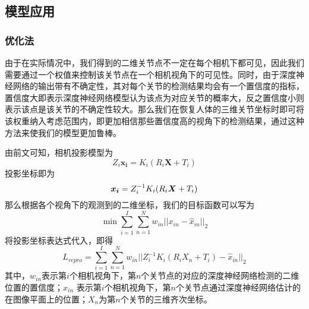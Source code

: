 \subsection{模型应用}

\subsubsection{优化法}
由于在实际情况中，我们得到的二维关节点不一定在每个相机下都可见，因此我们需要通过一个权值来控制该关节点在一个相机视角下的可见性。同时，由于深度神经网络的输出带有不确定性，其对每个关节的检测结果均会有一个置信度的指标，置信度大即表示深度神经网络模型认为该点为对应关节的概率大，反之置信度小则表示该点是该关节的不确定性较大。那么我们在恢复人体的三维关节坐标时即可将该权重纳入考虑范围内，即更加相信那些置信度高的视角下的检测结果，通过这种方法来使我们的模型更加鲁棒。

由前文可知，相机投影模型为
\begin{equation}
    Z_i \bm{x_i} = K_i(R_i\bm{X} + T_i)
\end{equation}
投影坐标即为
\begin{equation}
    \bm{x_i} = Z_i^{-1}K_i(R_i{\bm{X}} + T_i)
\end{equation}
那么根据各个视角下的观测到的二维坐标，我们的目标函数可以写为
\begin{equation}
    \min \sum^I_{i=1} \sum_{n=1}^N w_{in}||x_{in} - \hat x_{in}||_2
\end{equation}
将投影坐标表达式代入，即得
\begin{equation}
    L_{repro} = \sum^I_{i=1} \sum_{n=1}^N w_{in}||Z_i^{-1}K_i(R_iX_n + T_i) - \hat x_{in}||_2
\end{equation}
\newcommand{\mi}{第\(i\)个}
\newcommand{\mn}{第\(n\)个}
其中，$w_{in}$表示\mi 相机视角下，\mn 关节点的对应的深度神经网络检测的二维位置的置信度；$\hat x_{in}$ 表示\mi 相机视角下，\mn 关节点通过深度神经网络估计的在图像平面上的位置；$X_n$为\mn 关节的三维齐次坐标。

